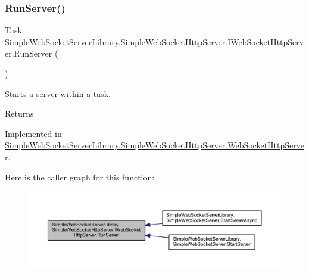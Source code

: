 \subsubsection{\texorpdfstring{Run\+Server()}{RunServer()}}
{\footnotesize\ttfamily Task Simple\+Web\+Socket\+Server\+Library.\+Simple\+Web\+Socket\+Http\+Server.\+I\+Web\+Socket\+Http\+Server.\+Run\+Server (\begin{DoxyParamCaption}{ }\end{DoxyParamCaption})}



Starts a server within a task. 

\begin{DoxyReturn}{Returns}

\end{DoxyReturn}


Implemented in \mbox{\hyperlink{class_simple_web_socket_server_library_1_1_simple_web_socket_http_server_1_1_web_socket_http_server_a57b76afde46781493110c513b984417c}{Simple\+Web\+Socket\+Server\+Library.\+Simple\+Web\+Socket\+Http\+Server.\+Web\+Socket\+Http\+Server}}.

Here is the caller graph for this function\+:
\nopagebreak
\begin{figure}[H]
\begin{center}
\leavevmode
\includegraphics[width=350pt]{interface_simple_web_socket_server_library_1_1_simple_web_socket_http_server_1_1_i_web_socket_http_server_ace7dda0ccffcbf99eb142e0b33ed3f54_icgraph}
\end{center}
\end{figure}
\mbox{\label{interface_simple_web_socket_server_library_1_1_simple_web_socket_http_server_1_1_i_web_socket_http_server_a73208116838cad69e1a7198ccfc89bbf}} 
